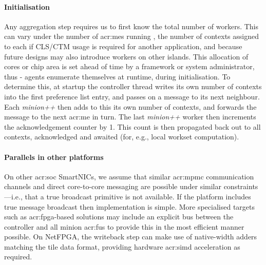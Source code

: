 \paragraph{Initialisation}
Any aggregation step requires us to first know the total number of workers.
This can vary under the number of \glspl{acr:me} running \approachshort{}, the number of contexts assigned to each if CLS/CTM usage is required for another application, and because future designs may also introduce workers on other islands.
This allocation of cores or chip area is set ahead of time by a framework or system administrator, thus \approachshort{}-\Coopfw{} agents enumerate themselves at runtime, during initialisation.
To determine this, at startup the controller thread writes its own number of contexts into the first preference list entry, and passes on a message to its next neighbour.
Each \emph{minion++} then adds to this its own number of contexts, and forwards the message to the next \gls{acr:me} in turn.
The last \emph{minion++} worker then increments the acknowledgement counter by 1.
This count is then propagated back out to all contexts, acknowledged and awaited (for, e.g., local workset computation).

\paragraph{Parallels in other platforms}
On other \gls{acr:soc} SmartNICs, we assume that similar \gls{acr:mpmc} communication channels and direct core-to-core messaging are possible under similar constraints---i.e., that a true broadcast primitive is not available.
If the platform includes true message broadcast then implementation is simple.
More specialised targets such as \gls{acr:fpga}-based solutions may include an explicit bus between the controller and all minion \glspl{acr:fu} to provide this in the most efficient manner possible.
On NetFPGA, the writeback step can make use of native-width adders matching the tile data format, providing hardware \gls{acr:simd} acceleration as required.

